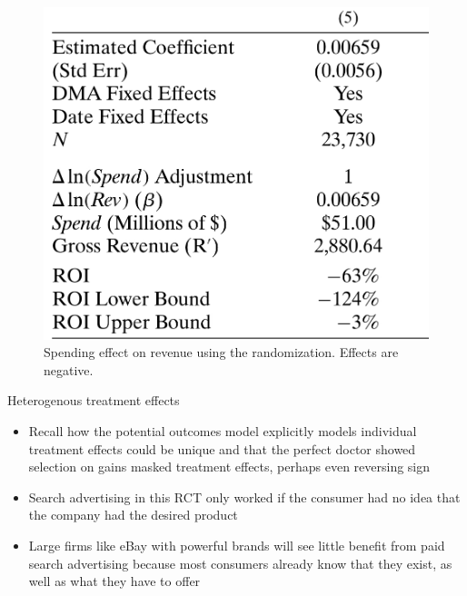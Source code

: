 \documentclass{beamer}
\begin{document}
\begin{frame}

  \begin{figure}
    \begin{center}
      \includegraphics[scale=0.2]{./lecture_includes/tadelis_ols2.png}
      \caption{Spending effect on revenue using the randomization. Effects are negative. }
    \end{center}
  \end{figure}

\end{frame}

\begin{frame}{Heterogenous treatment effects}

  \begin{itemize}
    \item Recall how the potential outcomes model explicitly models individual treatment effects could be unique and that the perfect doctor showed selection on gains masked treatment effects, perhaps even reversing sign
    \item Search advertising in this RCT only worked if the consumer had no idea that the company had the desired product
    \item Large firms like eBay with powerful brands will see little benefit from paid search advertising because most consumers already know that they exist, as well as what they have to offer
  \end{itemize}

\end{frame}
\end{document}
